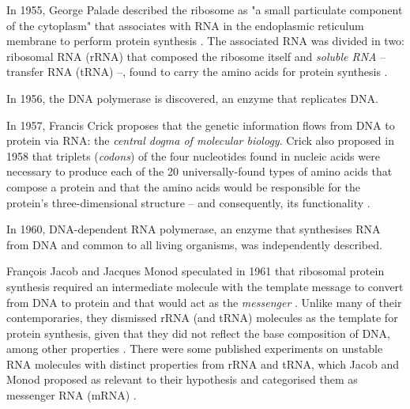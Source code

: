 


In 1955, George Palade described the ribosome as "a small particulate component of the cytoplasm" that associates with RNA in the endoplasmic reticulum membrane to perform protein synthesis \cite{palade:1955tf,jacob:1961uh}. The associated RNA was divided in two: ribosomal RNA (rRNA) that composed the ribosome itself and \emph{soluble RNA} -- transfer RNA (tRNA) --, found to carry the amino acids for protein synthesis \cite{hoagland:1958vm,jacob:1961uh}.

In 1956, the DNA polymerase is discovered, an enzyme that replicates DNA. 

In 1957, Francis Crick proposes that the genetic information flows from DNA to protein via RNA: the \emph{central dogma of molecular biology}.
Crick also proposed in 1958 that triplets (\emph{codons}) of the four nucleotides found in nucleic acids were necessary to produce each of the 20 universally-found types of amino acids that compose a protein \cite{crick:1958ws,crick:1961ui} and that the amino acids would be responsible for the protein's three-dimensional structure -- and consequently, its functionality \cite{crick:1958ws}.

In 1960, DNA-dependent RNA polymerase, an enzyme that synthesises RNA from DNA and common to all living organisms, was independently described.

François Jacob and Jacques Monod speculated in 1961 that ribosomal protein synthesis required an intermediate molecule with the template message to convert from DNA to protein and that would act as the \emph{messenger} \cite{jacob:1961uh,brenner:1961ve}. Unlike many of their contemporaries, they dismissed rRNA (and tRNA) molecules as the template for protein synthesis, given that they did not reflect the base composition of DNA, among other properties \cite{jacob:1961uh}. There were some published experiments on unstable RNA molecules with distinct properties from rRNA and tRNA, which Jacob and Monod proposed as relevant to their hypothesis and categorised them as messenger RNA (mRNA) \cite{jacob:1961uh,brenner:1961ve}.

